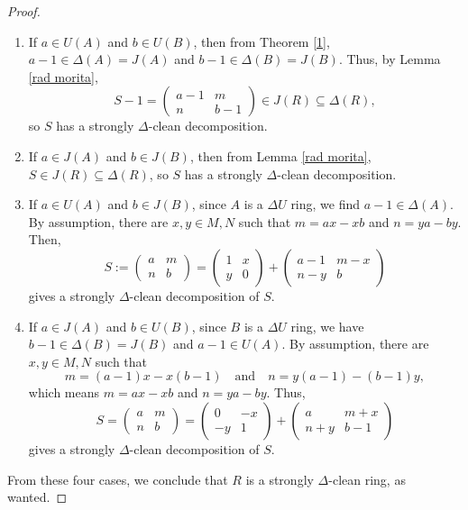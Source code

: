 \documentclass[10pt,a4paper]{amsart}
\begin{document}
\begin{proof}
\begin{enumerate}
\item If $a \in U(A)$ and $b \in U(B)$, then from Theorem \ref{1}, $a-1\in \Delta(A)=J(A)$ and $b-1 \in \Delta(B)=J(B)$. Thus, by Lemma \ref{rad morita},
\[
S-1 = \begin{pmatrix}
a-1 & m \\
n & b-1
\end{pmatrix} \in J(R) \subseteq \Delta(R),
\]
so $S$ has a strongly $\Delta$-clean decomposition.

\item If $a \in J(A)$ and $b \in J(B)$, then from Lemma \ref{rad morita}, $S \in J(R)\subseteq \Delta(R)$, so $S$ has a strongly $\Delta$-clean decomposition.

\item If $a \in U(A)$ and $b \in J(B)$, since $A$ is a $\Delta U$ ring, we find $a-1 \in \Delta(A)$. By assumption, there are $x,y \in M,N$ such that $m=ax-xb$ and $n=ya-by$. Then,
\[
S := \begin{pmatrix}
a & m \\
n & b
\end{pmatrix} = \begin{pmatrix}
1 & x \\
y & 0
\end{pmatrix} + \begin{pmatrix}
a-1 & m-x \\
n-y & b
\end{pmatrix}
\]
gives a strongly $\Delta$-clean decomposition of $S$.

\item If $a \in J(A)$ and $b \in U(B)$, since $B$ is a $\Delta U$ ring, we have $b-1 \in \Delta(B)=J(B)$ and $a-1 \in U(A)$. By assumption, there are $x,y \in M,N$ such that
\[
m = (a-1)x - x(b-1) \quad \text{and} \quad n = y(a-1) - (b-1)y,
\]
which means $m=ax-xb$ and $n=ya-by$. Thus,
\[
S = \begin{pmatrix}
a & m \\
n & b
\end{pmatrix} = \begin{pmatrix}
0 & -x \\
-y & 1
\end{pmatrix} + \begin{pmatrix}
a & m+x \\
n+y & b-1
\end{pmatrix}
\]
gives a strongly $\Delta$-clean decomposition of $S$.
\end{enumerate}

From these four cases, we conclude that $R$ is a strongly $\Delta$-clean ring, as wanted.
\end{proof}
\end{document}
